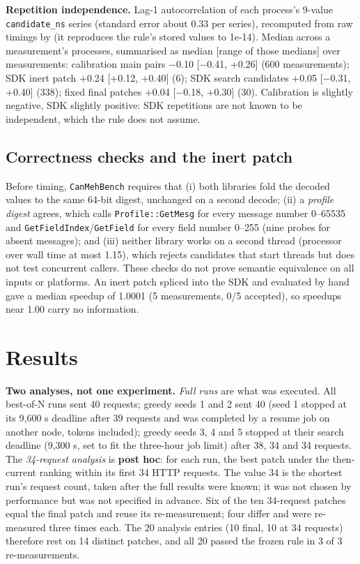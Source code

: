 \documentclass[10pt,a4paper]{article}
\begin{document}
\textbf{Repetition independence.} Lag-1 autocorrelation of each process's 9-value \texttt{candidate\_ns} series (standard error about 0.33 per series), recomputed from raw timings by  (it reproduces the rule's stored values to 1e-14). Median across a measurement's processes, summarised as median [range of those medians] over measurements: calibration main pairs $-$0.10 [$-$0.41, +0.26] (600 measurements); SDK inert patch +0.24 [+0.12, +0.40] (6); SDK search candidates +0.05 [$-$0.31, +0.40] (338); fixed final patches +0.04 [$-$0.18, +0.30] (30). Calibration is slightly negative, SDK slightly positive: SDK repetitions are not known to be independent, which the rule does not assume.

\subsection{Correctness checks and the inert patch}
Before timing, \texttt{CanMehBench} requires that (i) both libraries fold the decoded values to the same 64-bit digest, unchanged on a second decode; (ii) a \emph{profile digest} agrees, which calls \texttt{Profile::GetMesg} for every message number 0--65535 and \texttt{GetFieldIndex}/\texttt{GetField} for every field number 0--255 (nine probes for absent messages); and (iii) neither library works on a second thread (processor over wall time at most 1.15), which rejects candidates that start threads but does not test concurrent callers. These checks do not prove semantic equivalence on all inputs or platforms. An inert patch spliced into the SDK and evaluated by hand gave a median speedup of 1.0001 (5 measurements, 0/5 accepted), so speedups near 1.00 carry no information.

\section{Results}
\textbf{Two analyses, not one experiment.} \emph{Full runs} are what was executed. All best-of-N runs sent 40 requests; greedy seeds 1 and 2 sent 40 (seed 1 stopped at its 9,600 s deadline after 39 requests and was completed by a resume job on another node, tokens included); greedy seeds 3, 4 and 5 stopped at their search deadline (9,300 s, set to fit the three-hour job limit) after 38, 34 and 34 requests. The \emph{34-request analysis} is \textbf{post hoc}: for each run, the best patch under the then-current ranking within its first 34 HTTP requests. The value 34 is the shortest run's request count, taken after the full results were known; it was not chosen by performance but was not specified in advance. Six of the ten 34-request patches equal the final patch and reuse its re-measurement; four differ and were re-measured three times each. The 20 analysis entries (10 final, 10 at 34 requests) therefore rest on 14 distinct patches, and all 20 passed the frozen rule in 3 of 3 re-measurements.
\end{document}
